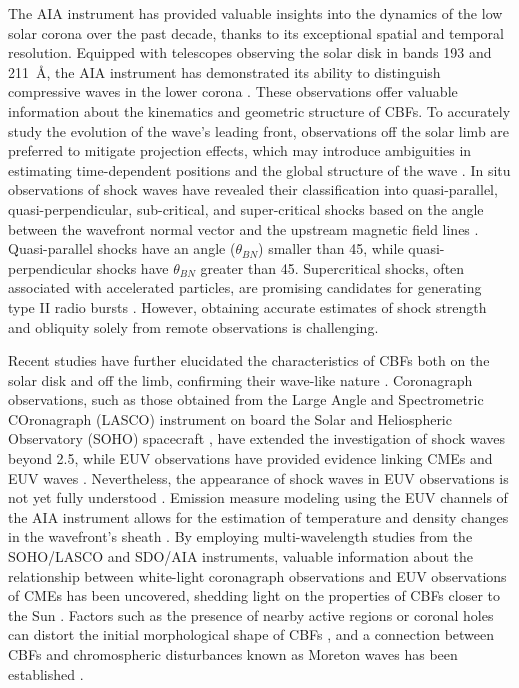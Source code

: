 The AIA instrument has provided valuable insights into the dynamics of the low solar corona over the past decade, thanks to its exceptional spatial and temporal resolution. Equipped with telescopes observing the solar disk in bands 193 and 211~\AA, the AIA instrument has demonstrated its ability to distinguish compressive waves in the lower corona \citep{patsourakos_2010, ma_2011, kozarev_2011}. These observations offer valuable information about the kinematics and geometric structure of CBFs. To accurately study the evolution of the wave's leading front, observations off the solar limb are preferred to mitigate projection effects, which may introduce ambiguities in estimating time-dependent positions and the global structure of the wave \citep{kozarev_2015}.
In situ observations of shock waves have revealed their classification into quasi-parallel, quasi-perpendicular, sub-critical, and super-critical shocks based on the angle between the wavefront normal vector and the upstream magnetic field lines \citep{tsurutani_1985}. Quasi-parallel shocks have an angle ($\theta_{BN}$) smaller than 45\degree, while quasi-perpendicular shocks have $\theta_{BN}$ greater than 45\degree. Supercritical shocks, often associated with accelerated particles, are promising candidates for generating type II radio bursts \citep{benz_1988}. However, obtaining accurate estimates of shock strength and obliquity solely from remote observations is challenging.

Recent studies have further elucidated the characteristics of CBFs both on the solar disk and off the limb, confirming their wave-like nature \citep{nitta_2013, long_2011, olmedo_2012}. Coronagraph observations, such as those obtained from the Large Angle and Spectrometric COronagraph (LASCO) instrument on board the Solar and Heliospheric Observatory (SOHO) spacecraft \citep{domingo_1995}, have extended the investigation of shock waves beyond 2.5\rsun \citep{vourlidas_2003}, while EUV observations have provided evidence linking CMEs and EUV waves \citep{patsourakos_2009}. Nevertheless, the appearance of shock waves in EUV observations is not yet fully understood \citep{kozarev_2011}. Emission measure modeling using the EUV channels of the AIA instrument allows for the estimation of temperature and density changes in the wavefront's sheath \citep{kozarev_2011}. By employing multi-wavelength studies from the SOHO/LASCO and SDO/AIA instruments, valuable information about the relationship between white-light coronagraph observations and EUV observations of CMEs has been uncovered, shedding light on the properties of CBFs closer to the Sun \citep{warmuth_2015}. Factors such as the presence of nearby active regions or coronal holes can distort the initial morphological shape of CBFs \citep{ofman_2002, mann_2003, piantschitsch_2018}, and a connection between CBFs and chromospheric disturbances known as Moreton waves has been established \citep{thompson_1999b}.

